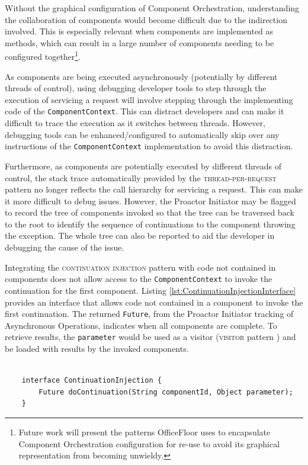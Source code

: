\documentclass[prodmode]{style/acmlarge}
\begin{document}
Without the graphical configuration of Component Orchestration, understanding
the collaboration of components would become difficult due to the indirection
involved.  This is especially relevant when components are implemented as
methods, which can result in a large number of components needing to
be configured together\footnote{Future work will present the patterns
OfficeFloor \cite{officefloor} uses to encapsulate Component Orchestration
configuration for re-use to avoid its graphical representation from becoming
unwieldy.}.

As components are being executed asynchronously (potentially by different
threads of control), using debugging developer tools to step through the
execution of servicing a request will involve stepping through the implementing
code of the \texttt{ComponentContext}.  This can distract developers and can
make it difficult to trace the execution as it switches between threads. 
However, debugging tools can be enhanced/configured to automatically skip over any
instructions of the \texttt{ComponentContext} implementation to avoid this
distraction.

Furthermore, as components are potentially executed by different threads of
control, the stack trace automatically provided by the
\textsc{thread-per-request} pattern no longer reflects the call hierarchy for
servicing a request.  This can make it more difficult to debug issues.  However,
the Proactor Initiator may be flagged to record the tree of components invoked
so that the tree can be traversed back to the root to identify the sequence of
continuations to the component throwing the exception.  The whole tree can also
be reported to aid the developer in debugging the cause of the issue.

Integrating the \textsc{continuation injection} pattern with code not contained
in components does not allow access to the \texttt{ComponentContext} to invoke
the continuation for the first component.  Listing
\ref{lst:ContinuationInjectionInterface} provides an interface that allows code
not contained in a component to invoke the first continuation.  The returned
\texttt{Future}, from the Proactor Initiator tracking of Asynchronous
Operations, indicates when all components are complete.  To retrieve results,
the \texttt{parameter} would be used as a visitor (\textsc{visitor} pattern
\cite{gof}) and be loaded with results by the invoked components.

\begin{lstlisting}[float,label=lst:ContinuationInjectionInterface]

    interface ContinuationInjection {
        Future doContinuation(String componentId, Object parameter);
    }
\end{lstlisting}
\end{document}
